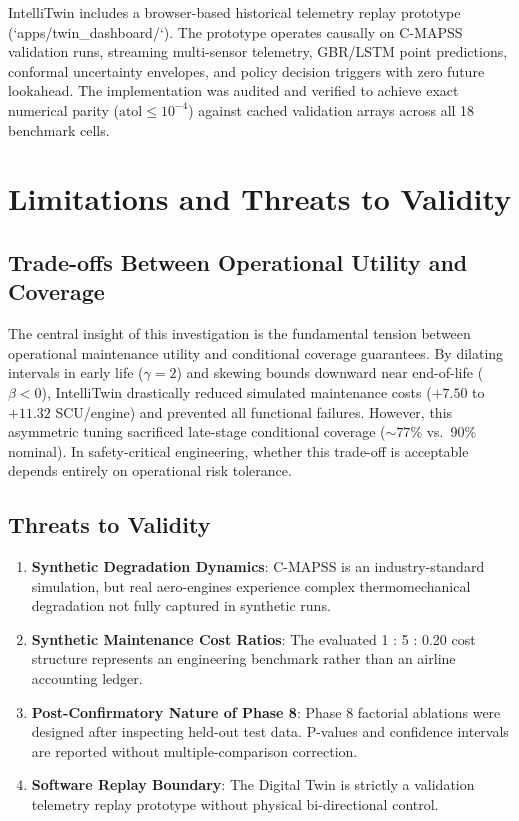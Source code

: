 \documentclass[conference,a4paper]{IEEEtran}
\begin{document}
IntelliTwin includes a browser-based historical telemetry replay prototype (`apps/twin_dashboard/`). The prototype operates causally on C-MAPSS validation runs, streaming multi-sensor telemetry, GBR/LSTM point predictions, conformal uncertainty envelopes, and policy decision triggers with zero future lookahead. The implementation was audited and verified to achieve exact numerical parity ($\text{atol} \le 10^{-4}$) against cached validation arrays across all 18 benchmark cells.

\section{Limitations and Threats to Validity}

\subsection{Trade-offs Between Operational Utility and Coverage}
The central insight of this investigation is the fundamental tension between operational maintenance utility and conditional coverage guarantees. By dilating intervals in early life ($\gamma=2$) and skewing bounds downward near end-of-life ($\beta < 0$), IntelliTwin drastically reduced simulated maintenance costs ($+7.50$ to $+11.32$ SCU/engine) and prevented all functional failures. However, this asymmetric tuning sacrificed late-stage conditional coverage ($\sim 77\%$ vs.\ 90\% nominal). In safety-critical engineering, whether this trade-off is acceptable depends entirely on operational risk tolerance.

\subsection{Threats to Validity}
\begin{enumerate}
    \item \textbf{Synthetic Degradation Dynamics}: C-MAPSS is an industry-standard simulation, but real aero-engines experience complex thermomechanical degradation not fully captured in synthetic runs.
    \item \textbf{Synthetic Maintenance Cost Ratios}: The evaluated 1 : 5 : 0.20 cost structure represents an engineering benchmark rather than an airline accounting ledger.
    \item \textbf{Post-Confirmatory Nature of Phase 8}: Phase 8 factorial ablations were designed after inspecting held-out test data. P-values and confidence intervals are reported without multiple-comparison correction.
    \item \textbf{Software Replay Boundary}: The Digital Twin is strictly a validation telemetry replay prototype without physical bi-directional control.
\end{enumerate}
\end{document}
